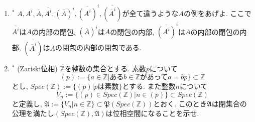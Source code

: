 \documentclass[dvipdfmx,a4paper,11pt]{article}
\newcommand{\Z}{\mathbb{Z}}
\theoremstyle{definition}
\begin{document}
\begin{enumerate}[ label=\textbf{問}2.\arabic*]
\item  $^{*}$ $A,A^{i},\overline{A}, \overline{A^i}, {(\overline{A})}^i, {\overline{(A^i)}}^i, \overline{({\overline{A}}^i)}$が全て違うような$A$の例をあげよ.
ここで$\overline{A^i}$は$A$の内部の閉包, 
${(\overline{A})}^i$は$A$の閉包の内部, ${\overline{(A^i)}}^i$は$A$の内部の閉包の内部, $\overline{({\overline{A}}^i)}$は$A$の閉包の内部の閉包である.
\item $^{*}$ (Zariski位相)
$\Z$を整数の集合とする. 素数$p$について
$$(p) := \{ a \in \Z | \text{ある$b \in \Z$があって$a =bp$}\} \subset \Z$$
とし, $Spec(\Z) := \{(p) | \text{$p$は素数} \}$とする.
また整数$n$について
$$
V_{n} := \{ (p) \in Spec(\Z) | n\in (p)\} \subset Spec(\Z) 
$$
と定義し, $\mathfrak{A} := \{V_{n} | n \in \Z \} \subset \mathfrak{P}(Spec(\Z) ) $とおく.
このとき$\mathfrak{A}$は閉集合の公理を満たし$(Spec(\Z), \mathfrak{A})$は位相空間になることを示せ.


 \end{enumerate}
 
\newpage




 
\end{document}
